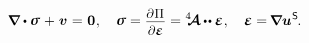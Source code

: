 \noindent
{}

\nopagebreak\vspace{-0.8em}
\begin{equation}
\label{lineartheory:wholesetofequations}
\boldnabla \dotp \linearstress \hspace{.15ex} + \hspace{.15ex} \bm{v}
\hspace{.1ex} = \hspace{.1ex}
\zerovector
\hspace{.1ex} ,
\hspace{1em}
%
\linearstress = \scalebox{.92}{$
   \displaystyle
   \frac{ \raisemath{-0.133em}{
      \partial \hspace{.1ex} \potentialenergydensity^{\mathstrut}
   }%
   }%
   { \raisemath{-0.07em}{\partial \infinitesimaldeformation} }
$}
=
\stiffnesstensor
\hspace{-0.1ex} \dotdotp
\infinitesimaldeformation
\hspace{.1ex} ,
\hspace{1em}
%
\infinitesimaldeformation
= \hspace{-0.2ex}
\boldnabla {\bm{u}}^{\hspace{.1ex}\mathsf{S}}
\hspace{-0.2ex} .
\end{equation}

